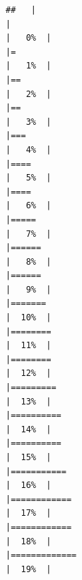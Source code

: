 \documentclass[
]{article}
\begin{document}
\begin{verbatim}
##   |                                                                              |                                                                      |   0%  |                                                                              |=                                                                     |   1%  |                                                                              |==                                                                    |   2%  |                                                                              |==                                                                    |   3%  |                                                                              |===                                                                   |   4%  |                                                                              |====                                                                  |   5%  |                                                                              |====                                                                  |   6%  |                                                                              |=====                                                                 |   7%  |                                                                              |======                                                                |   8%  |                                                                              |======                                                                |   9%  |                                                                              |=======                                                               |  10%  |                                                                              |========                                                              |  11%  |                                                                              |========                                                              |  12%  |                                                                              |=========                                                             |  13%  |                                                                              |==========                                                            |  14%  |                                                                              |==========                                                            |  15%  |                                                                              |===========                                                           |  16%  |                                                                              |============                                                          |  17%  |                                                                              |============                                                          |  18%  |                                                                              |=============                                                         |  19%  |                                                                              
\end{verbatim}
\end{document}
